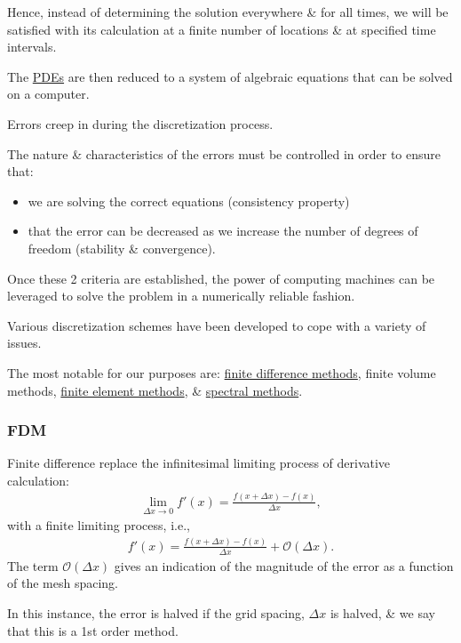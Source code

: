 \documentclass{article}
\begin{document}
Hence, instead of determining the solution everywhere \& for all times, we will be satisfied with its calculation at a finite number of locations \& at specified time intervals.

The \href{https://en.wikipedia.org/wiki/Partial_differential_equations}{PDEs} are then reduced to a system of algebraic equations that can be solved on a computer.

Errors creep in during the discretization process.

The nature \& characteristics of the errors must be controlled in order to ensure that:
\begin{itemize}
	\item we are solving the correct equations (consistency property)
	\item that the error can be decreased as we increase the number of degrees of freedom (stability \& convergence).
\end{itemize}
Once these 2 criteria are established, the power of computing machines can be leveraged to solve the problem in a numerically reliable fashion.

Various discretization schemes have been developed to cope with a variety of issues.

The most notable for our purposes are: \href{https://en.wikipedia.org/wiki/Finite_difference_methods}{finite difference methods}, finite volume methods, \href{https://en.wikipedia.org/wiki/Finite_element_methods}{finite element methods}, \& \href{https://en.wikipedia.org/wiki/Spectral_methods}{spectral methods}.

\subsubsection{FDM}
Finite difference replace the infinitesimal limiting process of derivative calculation:
\begin{align*}
	\lim_{\Delta x\to 0} f'(x) = \frac{f(x + \Delta x) - f(x)}{\Delta x},
\end{align*}
with a finite limiting process, i.e.,
\begin{align*}
	f'(x) = \frac{f(x + \Delta x) - f(x)}{\Delta x} + \mathcal{O}(\Delta x).
\end{align*}
The term $\mathcal{O}(\Delta x)$ gives an indication of the magnitude of the error as a function of the mesh spacing.

In this instance, the error is halved if the grid spacing, $\Delta x$ is halved, \& we say that this is a 1st order method.
\end{document}

